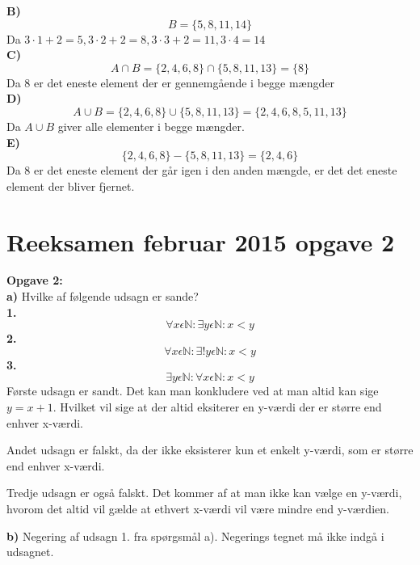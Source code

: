 \documentclass{article}
\begin{document}
\textbf{B)}\\
$$B = \{5, 8, 11, 14\}$$
Da $3\cdot1+2=5, 3\cdot2+2=8, 3\cdot3+2=11, 3\cdot4=14$\\

\textbf{C)}\\
$$A \cap B = \{2,4,6,8\} \cap \{5,8,11,13\} = \{8\}$$
Da 8 er det eneste element der er gennemgående i begge mængder\\

\textbf{D)}\\
$$A \cup B = \{2,4,6,8\} \cup \{5,8,11,13\} = \{2,4,6,8,5,11,13\}$$
Da $A \cup B$ giver alle elementer i begge mængder.\\

\textbf{E)}\\
$$\{2,4,6,8\} - \{5,8,11,13\} = \{2,4,6\}$$
Da 8 er det eneste element der går igen i den anden mængde, er det det eneste element der bliver fjernet. \\

\section{Reeksamen februar 2015 opgave 2}

\textbf{Opgave 2:}\\
\textbf{a)} Hvilke af følgende udsagn er sande?\\
\textbf{1.} 
\begin{displaymath}
\forall x \epsilon \mathbb{N}: \exists y \epsilon \mathbb{N}: x<y
\end{displaymath}
\textbf{2.}\begin{displaymath}
\forall x \epsilon \mathbb{N}: \exists !y \epsilon \mathbb{N}: x<y
\end{displaymath}
\textbf{3.}\begin{displaymath}
\exists y  \epsilon \mathbb{N}: \forall x  \epsilon  \mathbb{N}: x<y
\end{displaymath}
Første udsagn er sandt. Det kan man konkludere ved at man altid kan sige \(y = x + 1\). Hvilket vil sige at der altid eksiterer en y-værdi der er større end enhver x-værdi. 

Andet udsagn er falskt, da der ikke eksisterer kun et enkelt y-værdi, som er større end enhver x-værdi. 

Tredje udsagn er også falskt. Det kommer af at man ikke kan vælge en y-værdi, hvorom det altid vil gælde at ethvert x-værdi vil være mindre end y-værdien.

\textbf{b)} Negering af udsagn 1. fra spørgsmål a). Negerings tegnet må ikke indgå i udsagnet. 
\end{document}

